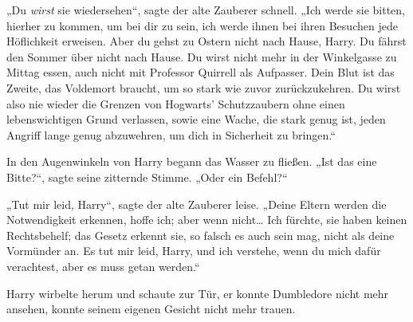 „Du \emph{wirst} sie wiedersehen“, sagte der alte Zauberer schnell. „Ich werde sie bitten, hierher zu kommen, um bei dir zu sein, ich werde ihnen bei ihren Besuchen jede Höflichkeit erweisen. Aber du gehst zu Ostern nicht nach Hause, Harry. Du fährst den Sommer über nicht nach Hause. Du wirst nicht mehr in der Winkelgasse zu Mittag essen, auch nicht mit Professor Quirrell als Aufpasser. Dein Blut ist das Zweite, das Voldemort braucht, um so stark wie zuvor zurückzukehren. Du wirst also nie wieder die Grenzen von Hogwarts' Schutzzaubern ohne einen lebenswichtigen Grund verlassen, sowie eine Wache, die stark genug ist, jeden Angriff lange genug abzuwehren, um dich in Sicherheit zu bringen.“

In den Augenwinkeln von Harry begann das Wasser zu fließen. „Ist das eine Bitte?“, sagte seine zitternde Stimme. „Oder ein Befehl?“

„Tut mir leid, Harry“, sagte der alte Zauberer leise. „Deine Eltern werden die Notwendigkeit erkennen, hoffe ich; aber wenn nicht… Ich fürchte, sie haben keinen Rechtsbehelf; das Gesetz erkennt sie, so falsch es auch sein mag, nicht als deine Vormünder an. Es tut mir leid, Harry, und ich verstehe, wenn du mich dafür verachtest, aber es muss getan werden.“

Harry wirbelte herum und schaute zur Tür, er konnte Dumbledore nicht mehr ansehen, konnte seinem eigenen Gesicht nicht mehr trauen.

